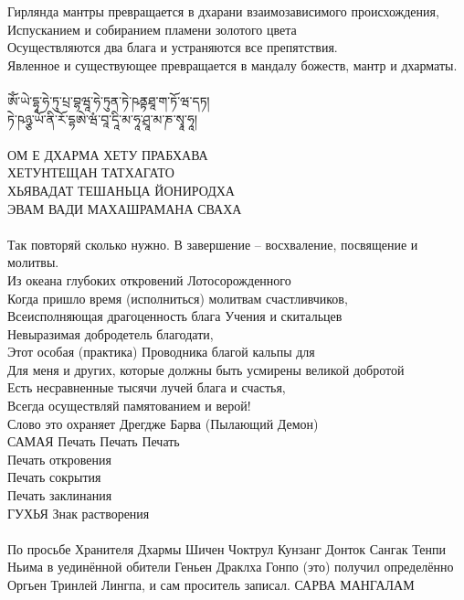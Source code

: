 \newpage
Гирлянда мантры превращается в дхарани взаимозависимого происхождения,\\
Испусканием и собиранием пламени золотого цвета\\
Осуществляются два блага и устраняются все препятствия.\\
Явленное и существующее превращается в мандалу божеств, мантр и дхарматы.\\
\\
\ti
ཨོཾ་ཡེ་དྷཱ་ཧེ་ཏུ་པྲ་བྷཝཱ་ཧེ་ཏུན་ཏེ་ཥནྟཐཱ་ག་ཏོ་ཝ་དཏ། \\
ཏེ་ཥཉྩ་ཡོ་ནི་རོ་དྷཨེ་ཝཾ་བཱ་དཱི་མ་ཧཱ་ཤྲཱ་མ་ཎ་སྭཱ་ཧཱ།\\
\\
\ru ОМ Е ДХАРМА ХЕТУ ПРАБХАВА \\
ХЕТУНТЕЩАН ТАТХАГАТО \\
ХЬЯВАДАТ ТЕШАНЬЦА ЙОНИРОДХА\\
ЭВАМ ВАДИ МАХАШРАМАНА СВАХА\\
\\
\scriptsize
Так повторяй сколько нужно. В завершение – восхваление, посвящение и молитвы.\\
Из океана глубоких откровений Лотосорожденного\\
Когда пришло время (исполниться) молитвам счастливчиков,\\
Всеисполняющая драгоценность блага Учения и скитальцев\\
Невыразимая добродетель благодати,\\
Этот особая (практика) Проводника благой кальпы для\\
Для меня и других, которые должны быть усмирены великой добротой\\
Есть несравненные тысячи лучей блага и счастья,\\
Всегда осуществляй памятованием и верой!\\
Слово это охраняет Дрегдже Барва (Пылающий Демон)\\
САМАЯ Печать Печать Печать \\
Печать откровения \\
Печать сокрытия \\
Печать заклинания \\
ГУХЬЯ Знак растворения\\
\\
По просьбе Хранителя Дхармы Шичен Чоктрул Кунзанг Донток Сангак Тенпи Ньима 
в уединённой обители Геньен Драклха Гонпо (это) получил определённо 
Оргьен Тринлей Лингпа, и сам проситель записал. САРВА МАНГАЛАМ\\
\normalsize
\newpage
